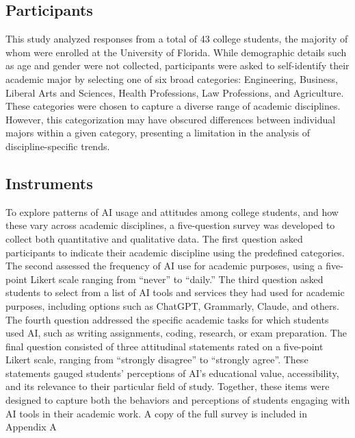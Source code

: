 \documentclass[12pt]{article}
\begin{document}
\subsection{Participants}
\label{subsec:participants}
This study analyzed responses from a total of 43 college students, the majority of whom were enrolled at the University of Florida. While demographic details such as age and gender were not collected, participants were asked to self-identify their academic major by selecting one of six broad categories: Engineering, Business, Liberal Arts and Sciences, Health Professions, Law Professions, and Agriculture. These categories were chosen to capture a diverse range of academic disciplines. However, this categorization may have obscured differences between individual majors within a given category, presenting a limitation in the analysis of discipline-specific trends.

\subsection{Instruments}
\label{subsec:instruments}
To explore patterns of AI usage and attitudes among college students, and how these vary across academic disciplines, a five-question survey was developed to collect both quantitative and qualitative data. The first question asked participants to indicate their academic discipline using the predefined categories. The second assessed the frequency of AI use for academic purposes, using a five-point Likert scale ranging from “never” to “daily.”
The third question asked students to select from a list of AI tools and services they had used for academic purposes, including options such as ChatGPT, Grammarly, Claude, and others. The fourth question addressed the specific academic tasks for which students used AI, such as writing assignments, coding, research, or exam preparation.
The final question consisted of three attitudinal statements rated on a five-point Likert scale, ranging from “strongly disagree” to “strongly agree”. These statements gauged students’ perceptions of AI’s educational value, accessibility, and its relevance to their particular field of study.
Together, these items were designed to capture both the behaviors and perceptions of students engaging with AI tools in their academic work. A copy of the full survey is included in Appendix A
\end{document}
